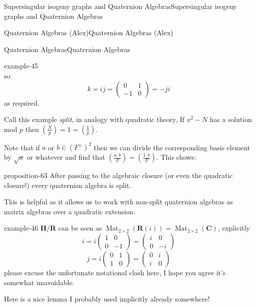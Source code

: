 \documentclass[10pt,]{book}
\numberwithin{equation}{section}
\newcommand{\legendre}[2]{\left(\frac{#1}{#2}\right)}
\newcommand{\RR}{\mathbf{R}}
\newcommand{\CC}{\mathbf{C}}
\newcommand{\HH}{\mathbf{H}}
\DeclareMathOperator{\Mat}{Mat}
\newcommand{\amp}{&}
\begin{document}
\begin{chapterptx}{Supersingular isogeny graphs and Quaternion Algebras}{}{Supersingular isogeny graphs and Quaternion Algebras}{}{}
\begin{sectionptx}{Quaternion Algebras (Alex)}{}{Quaternion Algebras (Alex)}{}{}
\begin{subsectionptx}{Quaternion Algebras}{}{Quaternion Algebras}{}{}
\begin{introduction}{}
\begin{example}{}{example-45}
\begin{equation*}
\end{equation*}
so%
\begin{equation*}
k = ij = \begin{pmatrix} 0\amp1\\-1\amp 0\end{pmatrix} = -ji
\end{equation*}
as required.%
\end{example}
\hypertarget{p-893}{}%
Call this example \emph{split}, in analogy with quadratic theory,  If \(x^2 - N\) has a solution mod \(p\) then \(\legendre{N}{p} = 1 = \legendre{1}{p}\).%
\par
\hypertarget{p-894}{}%
Note that if \(a\) or \(b \in (F^\times)^2\) then we can divide the corresponding basis element by \(\sqrt{a}\) or whatever and find that \(\legendre{a,b}{F} = \legendre{1,b}{F}\). This shows:%
\begin{proposition}{}{}{proposition-63}%
\hypertarget{p-895}{}%
After passing to the algebraic closure (or even the quadratic closure!) every quaternion algebra is split.%
\end{proposition}
\hypertarget{p-896}{}%
This is helpful as it allows us to work with non-split quaternion algebras as matrix algebras over a quadratic extension.%
\begin{example}{}{example-46}%
\hypertarget{p-897}{}%
\(\HH/\RR\) can be seen as \(\Mat_{2\times 2}(\RR(i)) = \Mat_{2\times 2}(\CC)\), explicitly%
\begin{equation*}
i=  i\begin{pmatrix} 1\amp0\\0\amp -1\end{pmatrix} = \begin{pmatrix} i\amp0\\0\amp -i\end{pmatrix}
\end{equation*}
%
\begin{equation*}
j = i\begin{pmatrix} 0\amp1\\1\amp 0\end{pmatrix} = \begin{pmatrix} 0\amp i\\i\amp 0\end{pmatrix}
\end{equation*}
please excuse the unfortunate notational clash here, I hope you agree it's somewhat unavoidable.%
\end{example}
\hypertarget{p-898}{}%
Here is a nice lemma I probably used implicitly already somewhere!%

\end{introduction}
\end{subsectionptx}
\end{sectionptx}
\end{chapterptx}
\end{document}
